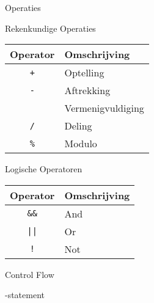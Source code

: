 \documentclass[a4paper]{article}
\newcommand{\examplecode}[2][javascript]{\begin{center}\begin{minipage}{.9\linewidth}\end{minipage}\end{center}}
\renewcommand{\section}[1]{
  \begin{center}
    \Huge\sc #1
  \end{center}
}
\renewcommand{\subsection}[1]{
  \begin{center}
    \Large\sc #1
  \end{center}
}
\begin{document}
\vfil

\section{Operaties}
\subsection{Rekenkundige Operaties}
\begin{center}
  \begin{tabular}{cl}
    {\bf Operator} & {\bf Omschrijving} \\
    \toprule
    {\tt +} & Optelling \\
    {\tt -} & Aftrekking \\
    {\tt *} & Vermenigvuldiging \\
    {\tt /} & Deling \\
    {\tt \%} & Modulo \\
  \end{tabular}
\end{center}

\subsection{Logische Operatoren}
\begin{center}
  \begin{tabular}{cl}
    {\bf Operator} & {\bf Omschrijving} \\
    \toprule
    {\tt \&\&} & And \\
    {\tt ||} & Or \\
    {\tt !} & Not \\
  \end{tabular}
\end{center}

\begin{samepage}
\section{Control Flow}
\vfil
\subsection{{\tt if}-statement}
\begin{center}
  \begin{minipage}{.45\textwidth}
    
  \end{minipage}
  \hspace{4mm}
  \begin{minipage}{.3\textwidth}
    \examplecode[MyJava]{if.java}
  \end{minipage}
\end{center}
\end{samepage}
\end{document}
